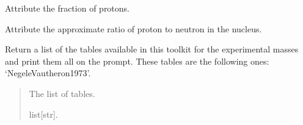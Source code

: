 \documentclass[letterpaper,10pt,english]{sphinxmanual}
\begin{document}
\begin{fulllineitems}

\begin{fulllineitems}
\label{\detokenize{source/api/setup_crust:nucleardatapy.setup_crust.SetupCrust.xp}}
\pysigstartsignatures
{}
\pysigstopsignatures
\sphinxAtStartPar
Attribute the fraction of protons.

\end{fulllineitems}


\begin{fulllineitems}
\label{\detokenize{source/api/setup_crust:nucleardatapy.setup_crust.SetupCrust.xpn_bound}}
\pysigstartsignatures
{}
\pysigstopsignatures
\sphinxAtStartPar
Attribute the approximate ratio of proton to neutron in the nucleus.

\end{fulllineitems}


\end{fulllineitems}


\begin{fulllineitems}
\label{\detokenize{source/api/setup_crust:nucleardatapy.setup_crust.models_crust}}
\pysigstartsignatures
{}
\pysigstopsignatures
\sphinxAtStartPar
Return a list of the tables available in this toolkit for the experimental masses and
print them all on the prompt. These tables are the following
ones: ‘Negele\sphinxhyphen{}Vautheron\sphinxhyphen{}1973’.
\begin{quote}\begin{description}
\sphinxAtStartPar
The list of tables.

\sphinxAtStartPar
list{[}str{]}.

\end{description}\end{quote}

\end{fulllineitems}
\end{document}
